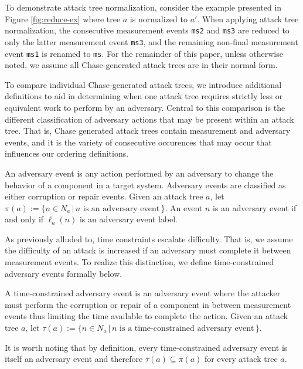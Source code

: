 \documentclass[runningheads]{llncs}
\theoremstyle{definition}
\begin{document}
\noindent To demonstrate attack tree normalization, consider the example presented in Figure \ref{fig:reduce-ex} where tree $a$ is normalized to $a'$. When applying attack tree normalization, the consecutive measurement events \texttt{ms2} and \texttt{ms3} are reduced to only the latter measurement event \texttt{ms3}, and the remaining non-final measurement event \texttt{ms1} is renamed to \texttt{ms}. For the remainder of this paper, unless otherwise noted, we assume all Chase-generated attack trees are in their normal form.

To compare individual Chase-generated attack trees, we introduce additional definitions to aid in determining when one attack tree requires strictly less or equivalent work to perform by an adversary. Central to this comparison is the different classification of adversary actions that may be present within an attack tree. That is, Chase generated attack trees contain measurement and adversary events, and it is the variety of consecutive occurences that may occur that influences our ordering definitions.  

\begin{definition}
    An adversary event is any action performed by an adversary to change the behavior of a component in a target system. Adversary events are classified as either corruption or repair events. Given an attack tree $a$, let $\pi(a) := \{n \in N_a \,|\, n \text{ is an adversary event}\,\}$. An event $n$ is an adversary event if and only if $\ell_a(n)$ is an adversary event label.
\end{definition}


As previously alluded to, time constraints escalate difficulty. That is, we assume the difficulty of an attack is increased if an adversary must complete it between measurement events. To realize this distinction, we define time-constrained adversary events formally below.  

\begin{definition}
    A time-constrained adversary event is an adversary event where the attacker must perform the corruption or repair of a component in between measurement events thus limiting the time available to complete the action. Given an attack tree $a$, let $\tau(a) := \{n \in N_a \,|\, n \text{ is a time-constrained adversary event}\,\}$.
\end{definition}

\noindent It is worth noting that by definition, every time-constrained adversary event is itself an adversary event and therefore $\tau(a) \subseteq \pi(a)$ for every attack tree $a$.
\end{document}
